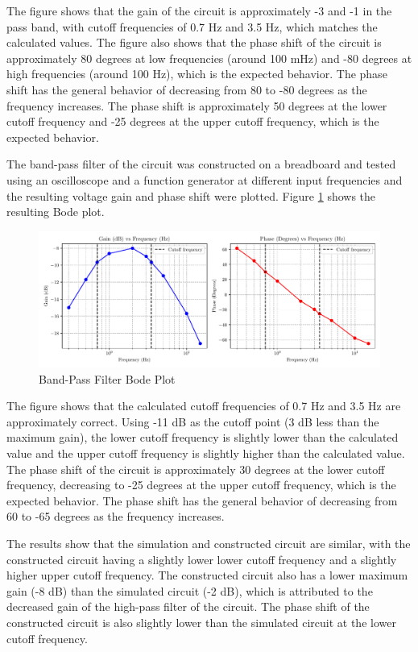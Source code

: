 \documentclass[CMPE]{KGCOEReport}
\begin{document}
The figure shows that the gain of the circuit is approximately -3 and -1 in the pass band, with cutoff frequencies of 0.7 Hz and 3.5 Hz, which matches the calculated values. The figure also shows that the phase shift of the circuit is approximately 80 degrees at low frequencies (around 100 mHz) and -80 degrees at high frequencies (around 100 Hz), which is the expected behavior. The phase shift has the general behavior of decreasing from 80 to -80 degrees as the frequency increases. The phase shift is approximately 50 degrees at the lower cutoff frequency and -25 degrees at the upper cutoff frequency, which is the expected behavior.

The band-pass filter of the circuit was constructed on a breadboard and tested using an oscilloscope and a function generator at different input frequencies and the resulting voltage gain and phase shift were plotted. Figure \ref{fig:bandPassBode} shows the resulting Bode plot.

\begin{figure}[H]
    \centering
    \includegraphics[width=1\textwidth]{band_pass_plot.pdf}
    \caption{Band-Pass Filter Bode Plot}
    \label{fig:bandPassBode}
\end{figure}

The figure shows that the calculated cutoff frequencies of 0.7 Hz and 3.5 Hz are approximately correct. Using -11 dB as the cutoff point (3 dB less than the maximum gain), the lower cutoff frequency is slightly lower than the calculated value and the upper cutoff frequency is slightly higher than the calculated value. The phase shift of the circuit is approximately 30 degrees at the lower cutoff frequency, decreasing to -25 degrees at the upper cutoff frequency, which is the expected behavior. The phase shift has the general behavior of decreasing from 60 to -65 degrees as the frequency increases.

The results show that the simulation and constructed circuit are similar, with the constructed circuit having a slightly lower lower cutoff frequency and a slightly higher upper cutoff frequency. The constructed circuit also has a lower maximum gain (-8 dB) than the simulated circuit (-2 dB), which is attributed to the decreased gain of the high-pass filter of the circuit. The phase shift of the constructed circuit is also slightly lower than the simulated circuit at the lower cutoff frequency.
\end{document}
